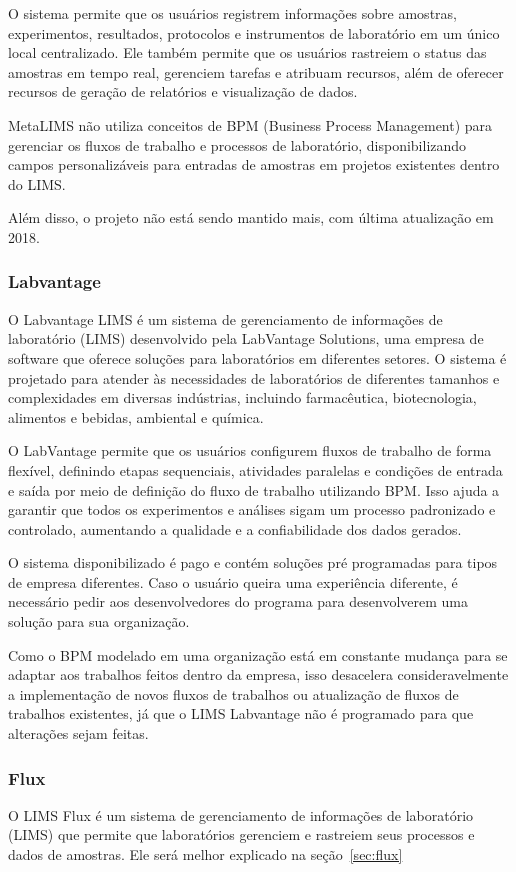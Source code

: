 O sistema permite que os usuários registrem informações sobre amostras, experimentos, resultados, protocolos e instrumentos de laboratório em um único local centralizado. Ele também permite que os usuários rastreiem o status das amostras em tempo real, gerenciem tarefas e atribuam recursos, além de oferecer recursos de geração de relatórios e visualização de dados.

MetaLIMS não utiliza conceitos de BPM (Business Process Management) para gerenciar os fluxos de trabalho e processos de laboratório, disponibilizando campos personalizáveis para entradas de amostras em projetos existentes dentro do LIMS.

Além disso, o projeto não está sendo mantido mais, com última atualização em 2018.

\subsubsection{Labvantage}

O Labvantage LIMS é um sistema de gerenciamento de informações de laboratório (LIMS) desenvolvido pela LabVantage Solutions, uma empresa de software que oferece soluções para laboratórios em diferentes setores. O sistema é projetado para atender às necessidades de laboratórios de diferentes tamanhos e complexidades em diversas indústrias, incluindo farmacêutica, biotecnologia, alimentos e bebidas, ambiental e química.

O LabVantage permite que os usuários configurem fluxos de trabalho de forma flexível, definindo etapas sequenciais, atividades paralelas e condições de entrada e saída por meio de definição do fluxo de trabalho utilizando BPM. Isso ajuda a garantir que todos os experimentos e análises sigam um processo padronizado e controlado, aumentando a qualidade e a confiabilidade dos dados gerados.

O sistema disponibilizado é pago e contém soluções pré programadas para tipos de empresa diferentes. Caso o usuário queira uma experiência diferente, é necessário pedir aos desenvolvedores do programa para desenvolverem uma solução para sua organização.

Como o BPM modelado em uma organização está em constante mudança para se adaptar aos trabalhos feitos dentro da empresa, isso desacelera consideravelmente a implementação de novos fluxos de trabalhos ou atualização de fluxos de trabalhos existentes, já que o LIMS Labvantage não é programado para que alterações sejam feitas.

\subsubsection{Flux}

O LIMS Flux é um sistema de gerenciamento de informações de laboratório (LIMS) que permite que laboratórios gerenciem e rastreiem seus processos e dados de amostras. Ele será melhor explicado na seção~\ref{sec:flux}




